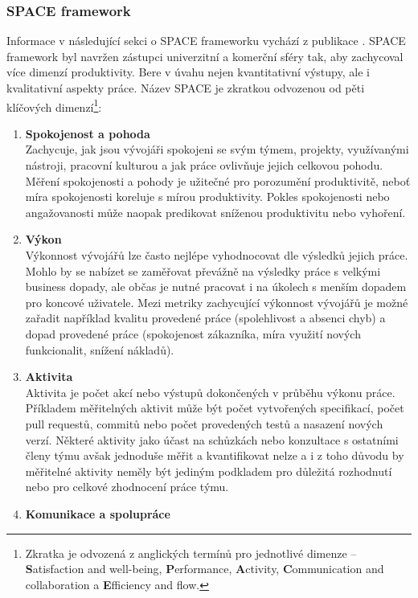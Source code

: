 \subsubsection{SPACE framework}\label{section:space-framework}
Informace v následující sekci o SPACE frameworku vychází z publikace \cite{space}. SPACE framework byl navržen zástupci univerzitní a komerční sféry tak, aby zachycoval více dimenzí produktivity. Bere v úvahu nejen kvantitativní výstupy, ale i kvalitativní aspekty práce. Název SPACE je zkratkou odvozenou od pěti klíčových dimenzí\footnote{Zkratka je odvozená z anglických termínů pro jednotlivé dimenze -- \textbf{S}atisfaction and well-being, \textbf{P}erformance, \textbf{A}ctivity, \textbf{C}ommunication and collaboration a \textbf{E}fficiency and flow.}:
\begin{enumerate}
    \item \textbf{Spokojenost a pohoda}\\
    Zachycuje, jak jsou vývojáři spokojeni se svým týmem, projekty, využívanými nástroji, pracovní kulturou a jak práce ovlivňuje jejich celkovou pohodu. Měření spokojenosti a pohody je užitečné pro porozumění produktivitě, neboť míra spokojenosti koreluje s mírou produktivity. Pokles spokojenosti nebo angažovanosti může naopak predikovat sníženou produktivitu nebo vyhoření. \cite{satisfaction-burnout}
    \item \textbf{Výkon}\\
    Výkonnost vývojářů lze často nejlépe vyhodnocovat dle výsledků jejich práce. Mohlo by se nabízet se zaměřovat převážně na výsledky práce s velkými business dopady, ale občas je nutné pracovat i na úkolech s menším dopadem pro koncové uživatele. Mezi metriky zachycující výkonnost vývojářů je možné zařadit například kvalitu provedené práce (spolehlivost a absenci chyb) a dopad provedené práce (spokojenost zákazníka, míra využití nových funkcionalit, snížení nákladů).
    \item \textbf{Aktivita}\\
    Aktivita je počet akcí nebo výstupů dokončených v průběhu výkonu práce. Příkladem měřitelných aktivit může být počet vytvořených specifikací, počet pull requestů, commitů nebo počet provedených testů a nasazení nových verzí. Některé aktivity jako účast na schůzkách nebo konzultace s ostatními členy týmu avšak jednoduše měřit a kvantifikovat nelze a i z toho důvodu by měřitelné aktivity neměly být jediným podkladem pro důležitá rozhodnutí nebo pro celkové zhodnocení práce týmu.
    \item \textbf{Komunikace a spolupráce}\\

\end{enumerate}
